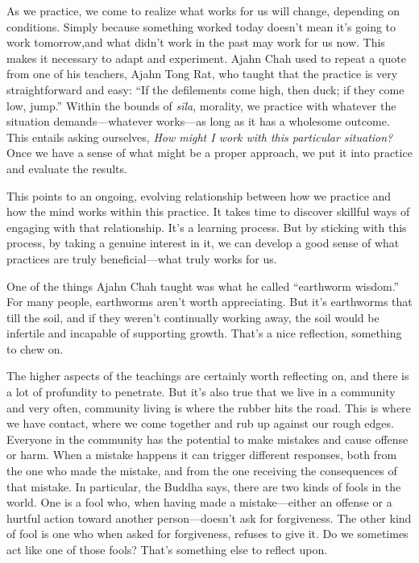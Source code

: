 As we practice, we come to realize what works for us will change, 
depending on conditions. Simply because something worked today doesn't 
mean it's going to work tomorrow,and what didn't work in the past may 
work for us now. This makes it necessary to adapt and experiment. Ajahn 
Chah used to repeat a quote from one of his teachers, Ajahn Tong Rat, 
who taught that the practice is very straightforward and easy: ``If the 
defilements come high, then duck; if they come low, jump.'' Within the 
bounds of \emph{sīla}, morality, we practice with whatever the 
situation demands---whatever works---as long as it has a wholesome 
outcome. This entails asking ourselves, \emph{How might I work with 
this particular situation?} Once we have a sense of what might be a 
proper approach, we put it into practice and evaluate the results.

This points to an ongoing, evolving relationship between how we 
practice and how the mind works within this practice. It takes time to 
discover skillful ways of engaging with that relationship. It's a 
learning process. But by sticking with this process, by taking a 
genuine interest in it, we can develop a good sense of what practices 
are truly beneficial---what truly works for us.


One of the things Ajahn Chah taught was what he called ``earthworm 
wisdom.'' For many people, earthworms aren't worth appreciating. But 
it's earthworms that till the soil, and if they weren't continually 
working away, the soil would be infertile and incapable of supporting 
growth. That's a nice reflection, something to chew on.

The higher aspects of the teachings are certainly worth reflecting on, 
and there is a lot of profundity to penetrate. But it's also true that 
we live in a community and very often, community living is where the 
rubber hits the road. This is where we have contact, where we come 
together and rub up against our rough edges. Everyone in the community 
has the potential to make mistakes and cause offense or harm. When a 
mistake happens it can trigger different responses, both from the one 
who made the mistake, and from the one receiving the consequences of 
that mistake. In particular, the Buddha says, there are two kinds of 
fools in the world. One is a fool who, when having made a 
mistake---either an offense or a hurtful action toward another 
person---doesn't ask for forgiveness. The other kind of fool is one who 
when asked for forgiveness, refuses to give it. Do we sometimes act 
like one of those fools? That's something else to reflect upon.

